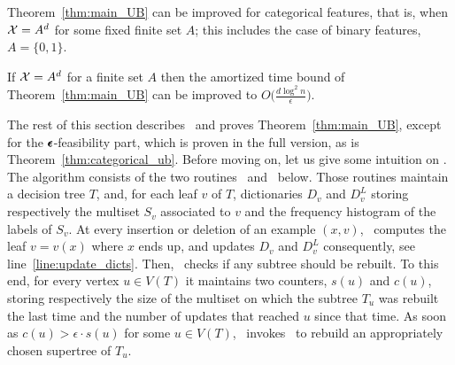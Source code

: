 Theorem~\ref{thm:main_UB} can be improved for categorical features, that is, when $\mathcal{X}=A^d$ for some fixed finite set $A$; this includes the case of binary features, $A=\{0,1\}$. 
\begin{theorem}\label{thm:categorical_ub}
If $\mathcal{X}=A^d$ for a finite set $A$ then the amortized time bound of Theorem~\ref{thm:main_UB} can be improved to $O\big(\frac{d \log^2 n}{\epsilon}\big)$.
\end{theorem}
The rest of this section describes \algo\ and proves Theorem~\ref{thm:main_UB}, except for the $\pmb{\epsilon}$-feasibility part, which is proven in the full version, as is Theorem~\ref{thm:categorical_ub}.
Before moving on, let us give some intuition on \algo.
The algorithm consists of the two routines \AlgoUpdate\ and \AlgoBuild\ below. Those routines maintain a decision tree $T$, and, for each leaf $v$ of $T$, dictionaries $D_v$ and $D_v^L$ storing respectively the multiset $S_v$ associated to $v$ and the frequency histogram of the labels of $S_v$. At every insertion or deletion of an example $(x,v)$, \AlgoUpdate\ computes the leaf $v=v(x)$ where $x$ ends up, and updates $D_v$ and $D^L_v$ consequently, see line~\ref{line:update_dicts}. Then, \AlgoUpdate\ checks if any subtree should be rebuilt. To this end, for every vertex $u \in V(T)$ it maintains two counters, $s(u)$ and $c(u)$, storing respectively the size of the multiset on which the subtree $T_u$ was rebuilt the last time and the number of updates that reached $u$ since that time. As soon as $c(u) > \epsilon \cdot s(u)$ for some $u \in V(T)$, \AlgoUpdate\ invokes \AlgoBuild\ to rebuild an appropriately chosen supertree of $T_u$.

